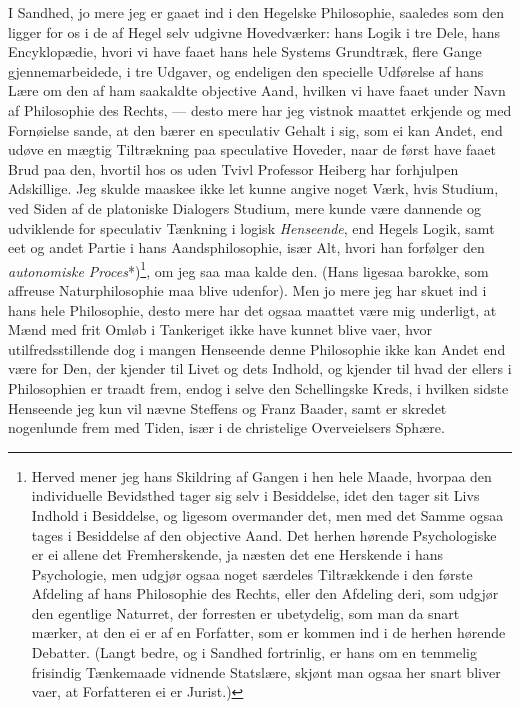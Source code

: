 \documentclass[12pt,a4paper]{book}
\newcommand{\apage}[1]{\marginnote{\footnotesize\textit{[#1]}}}
\begin{document}
I Sandhed, jo mere jeg er gaaet ind i den Hegelske Philosophie, saaledes som
den ligger for os i de af Hegel selv udgivne Hovedværker: hans Logik i tre
Dele, hans Encyklopædie, hvori vi have faaet hans hele Systems Grundtræk,
flere Gange gjennemarbeidede, i tre Udgaver, og endeligen den specielle
Udførelse af hans Lære om den af ham saakaldte objective Aand, hvilken vi
have faaet under Navn af Philosophie des Rechts, --- desto mere har jeg
vistnok maattet erkjende og med Fornøielse sande, at den bærer en speculativ
Gehalt i sig, som ei kan Andet, end udøve en mægtig Tiltrækning paa
speculative Hoveder, naar de først have faaet Brud paa den, hvortil hos os
uden Tvivl Professor Heiberg har forhjulpen Adskillige. Jeg skulde maaskee
ikke let \apage{30} kunne angive noget Værk, hvis Studium, ved Siden af de platoniske
Dialogers Studium, mere kunde være dannende og udviklende for speculativ
Tænkning i logisk \emph{Henseende}, end Hegels Logik, samt eet og andet Partie i
hans Aandsphilosophie, især Alt, hvori han forfølger den \emph{autonomiske
Proces}*)\footnote{Herved mener jeg hans Skildring af Gangen i hen hele
Maade, hvorpaa den individuelle Bevidsthed tager sig selv i Besiddelse, idet
den tager sit Livs Indhold i Besiddelse, og ligesom overmander det, men med
det Samme ogsaa tages i Besiddelse af den objective Aand. Det herhen hørende
Psychologiske er ei allene det Fremherskende, ja næsten det ene Herskende i
hans Psychologie, men udgjør ogsaa noget særdeles Tiltrækkende i den første
Afdeling af hans Philosophie des Rechts, eller den Afdeling deri, som udgjør
den egentlige Naturret, der forresten er ubetydelig, som man da snart
mærker, at den ei er af en Forfatter, som er kommen ind i de herhen hørende
Debatter. (Langt bedre, og i Sandhed fortrinlig, er hans om en temmelig
frisindig Tænkemaade vidnende Statslære, skjønt man ogsaa her snart bliver
vaer, at Forfatteren ei er Jurist.)}, om jeg saa maa kalde den. (Hans
ligesaa barokke, som affreuse Naturphilosophie maa blive udenfor).
Men jo mere jeg har skuet ind i hans hele Philosophie, desto mere har det
ogsaa maattet være mig underligt, at Mænd med frit Omløb i Tankeriget ikke
have kunnet blive vaer, hvor utilfredsstillende dog i mangen Henseende denne
Philosophie ikke kan Andet end være for Den, der kjender til Livet og dets
Indhold, og kjender til hvad der ellers i Philosophien er traadt frem, endog
i selve den Schellingske Kreds, i hvilken sidste Henseende jeg kun vil nævne
Steffens og Franz Baader, samt er skredet nogenlunde frem med Tiden, især i
de christelige Overveielsers Sphære.
\end{document}

